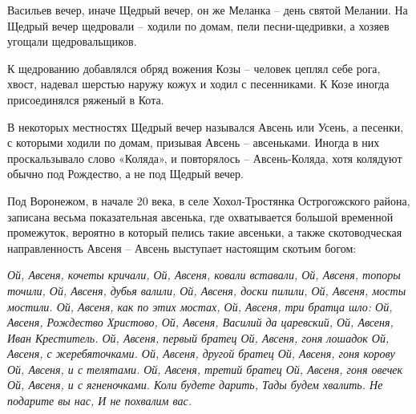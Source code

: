    Васильев вечер, иначе Щедрый вечер, он же Меланка – день святой Мелании. На Щедрый вечер щедровали – ходили по домам, пели песни-щедривки, а хозяев угощали щедровальщиков.

К щедрованию добавлялся обряд вожения Козы – человек цеплял себе рога, хвост, надевал шерстью наружу кожух и ходил с песенниками. К Козе иногда присоединялся ряженый в Кота.

В некоторых местностях Щедрый вечер назывался Авсень или Усень, а песенки, с которыми ходили по домам, призывая Авсень – авсеньками. Иногда в них проскальзывало слово «Коляда», и повторялось – Авсень-Коляда, хотя колядуют обычно под Рождество, а не под Щедрый вечер. 

Под Воронежом, в начале 20 века, в селе Хохол-Тростянка Острогожского района, записана весьма показательная авсенька, где охватывается большой временной промежуток, вероятно в который пелись такие авсеньки, а также скотоводческая направленность Авсеня – Авсень выступает настоящим скотьим богом:

\newpage

\textit{\noindent 
Ой, Авсеня, кочеты кричали,\newline 
Ой, Авсеня, ковали вставали,\newline 
Ой, Авсеня, топоры точили,\newline 
Ой, Авсеня, дубья валили,\newline 
Ой, Авсеня, доски пилили,\newline 
Ой, Авсеня, мосты мостили.\newline 
Ой, Авсеня, как по этих мостах,\newline 
Ой, Авсеня, три братца шло:\newline 
Ой, Авсеня, Рождество Христово, \newline
Ой, Авсеня, Василий да царевский, \newline
Ой, Авсеня, Иван Креститель. \newline
Ой, Авсеня, первый братец\newline
Ой, Авсеня, гоня лошадок \newline
Ой, Авсеня, с жеребяточками.\newline 
Ой, Авсеня, другой братец \newline
Ой, Авсеня, гоня корову \newline
Ой, Авсеня, и с телятами. \newline
Ой, Авсеня, третий братец \newline
Ой, Авсеня, гоня овечек \newline
Ой, Авсеня, и с ягненочками. \newline
Коли будете дарить, \newline
Тады будем хвалить. \newline
Не подарите вы нас, \newline
И не похвалим вас.\newline}

